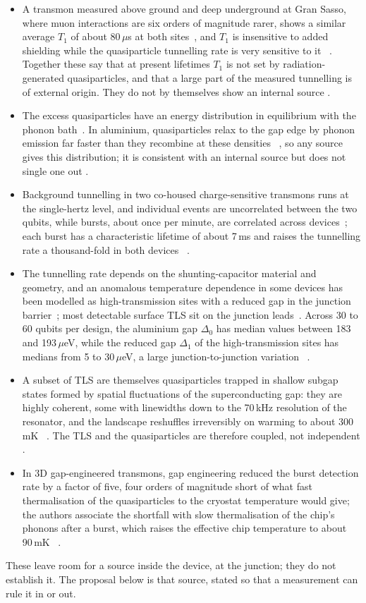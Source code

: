 \begin{itemize}
\item A transmon measured above ground and deep underground at Gran Sasso, where muon interactions are six orders of magnitude rarer, shows a
similar average $T_1$ of about 80\,$\mu$s at both sites~\cite{DeDominicis2026}, and
$T_1$ is insensitive to added shielding while the quasiparticle tunnelling rate is very sensitive to it~\cite{Gordon2022} \observed. Together these say that at present
lifetimes $T_1$ is not set by radiation-generated quasiparticles, and that a large part of the measured tunnelling is of external origin. They do not
by themselves show an internal source \interp.
\item The excess quasiparticles have an energy distribution in equilibrium with the phonon bath~\cite{Connolly2024}. In aluminium, quasiparticles relax to the gap edge by phonon
emission far faster than they recombine at these densities~\cite{Kaplan1976} \observed, so any source gives this distribution; it is consistent with an internal source but does
not single one out \interp.
\item Background tunnelling in two co-housed charge-sensitive transmons runs at the single-hertz level, and individual events are
uncorrelated between the two qubits, while bursts, about once per minute, are correlated across devices~\cite{Sundelin2026,McEwen2022};
each burst has a characteristic lifetime of about 7\,ms and raises the tunnelling rate a thousand-fold in both devices~\cite{Sundelin2026}
\observed.
\item The tunnelling rate depends on the shunting-capacitor material and geometry, and an anomalous temperature dependence in some devices has been
modelled as high-transmission sites with a reduced gap in the junction barrier~\cite{Kurter2022}; most detectable surface TLS sit on the junction
leads~\cite{Lisenfeld2025}. Across 30 to 60 qubits per design, the aluminium gap $\Delta_0$ has median values between 183 and 193\,$\mu$eV, while the reduced gap
$\Delta_1$ of the high-transmission sites has medians from 5 to 30\,$\mu$eV, a large junction-to-junction variation~\cite{Kurter2022}
\observed.
\item A subset of TLS are themselves quasiparticles trapped in shallow subgap states formed by spatial fluctuations of the
superconducting gap: they are highly coherent, some with linewidths down to the 70\,kHz resolution of the resonator, and the landscape
reshuffles irreversibly on warming to about 300\,mK~\cite{deGraaf2020} \observed. The TLS and the quasiparticles are therefore
coupled, not independent \interp.
\item In 3D gap-engineered transmons, gap engineering reduced the burst detection rate by a factor of five, four orders of magnitude
short of what fast thermalisation of the quasiparticles to the cryostat temperature would give; the authors associate the shortfall with
slow thermalisation of the chip's phonons after a burst, which raises the effective chip temperature to about 90\,mK~\cite{Nho2026}
\observed.
\end{itemize}
These leave room for a source inside the device, at the junction; they do not establish it. The proposal below is that source, stated so that a
measurement can rule it in or out.

